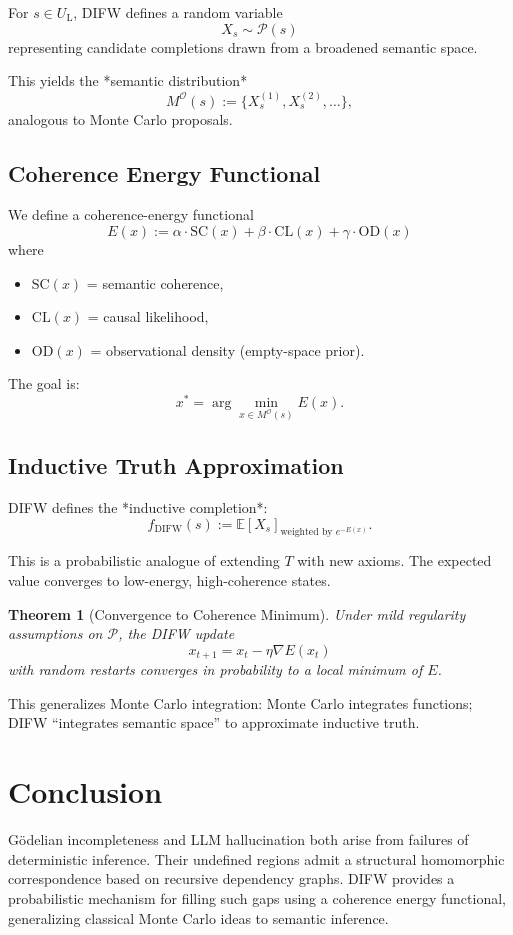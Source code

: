 \documentclass{article}
\newtheorem{theorem}{Theorem}
\begin{document}
For $s \in U_{\mathrm{L}}$, DIFW defines a random variable
\[
    X_s \sim \mathcal{P}(s)
\]
representing candidate completions drawn from a broadened semantic
space.

This yields the *semantic distribution*
\[
    M^{\mathcal{O}}(s) 
    := \{ X_s^{(1)}, X_s^{(2)}, \ldots \},
\]
analogous to Monte Carlo proposals.

\subsection{Coherence Energy Functional}

We define a coherence-energy functional
\[
    E(x)
    := \alpha \cdot \mathrm{SC}(x) 
     + \beta \cdot \mathrm{CL}(x)
     + \gamma \cdot \mathrm{OD}(x)
\]
where
\begin{itemize}
    \item $\mathrm{SC}(x)$ = semantic coherence,
    \item $\mathrm{CL}(x)$ = causal likelihood,
    \item $\mathrm{OD}(x)$ = observational density (empty-space prior).
\end{itemize}

The goal is:
\[
    x^\ast = 
    \arg\min_{x \in M^{\mathcal{O}}(s)} E(x).
\]

\subsection{Inductive Truth Approximation}

DIFW defines the *inductive completion*:
\[
    f_{\mathrm{DIFW}}(s) :=
    \mathbb{E}[X_s]_{\text{weighted by } e^{-E(x)}}.
\]

This is a probabilistic analogue of extending $T$ with new axioms.  
The expected value converges to low-energy, high-coherence states.

\begin{theorem}[Convergence to Coherence Minimum]
Under mild regularity assumptions on $\mathcal{P}$,
the DIFW update
\[
x_{t+1} = x_t - \eta \nabla E(x_t)
\]
with random restarts converges in probability to a local minimum of $E$.
\end{theorem}

This generalizes Monte Carlo integration:  
Monte Carlo integrates functions;  
DIFW ``integrates semantic space'' to approximate inductive truth.

\section{Conclusion}

Gödelian incompleteness and LLM hallucination both arise from failures of
deterministic inference.  
Their undefined regions admit a structural homomorphic correspondence
based on recursive dependency graphs.  
DIFW provides a probabilistic mechanism for filling such gaps using a
coherence energy functional, generalizing classical Monte Carlo ideas to
semantic inference.
\end{document}
